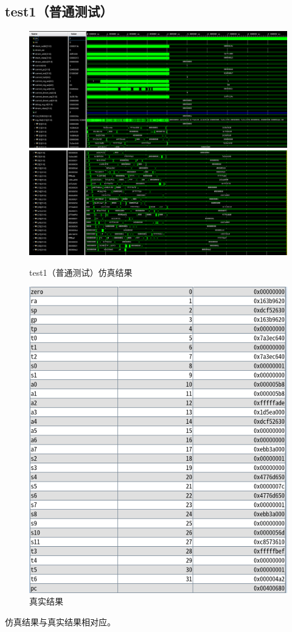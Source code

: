 \documentclass[12pt,a4paper]{ctexart}
\begin{document}
\subsection{test1（普通测试）}
\begin{figure}[H]
    \centering
    \includegraphics[scale=0.35]{pic/3.png}
    \includegraphics[scale=0.35]{pic/4.png}
    \caption{test1（普通测试）仿真结果}
\end{figure}
\begin{figure}[H]
    \centering
    \includegraphics[scale=1]{pic/5.png}
    \caption{真实结果}
\end{figure}
仿真结果与真实结果相对应。
\end{document}
